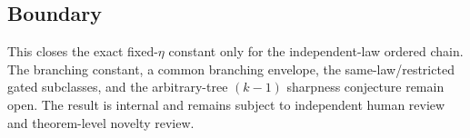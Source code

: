 \subsection*{Boundary}

This closes the exact fixed-$\eta$ constant only for the independent-law
ordered chain. The branching constant, a common branching envelope, the
same-law/restricted gated subclasses, and the arbitrary-tree $(k-1)$
sharpness conjecture remain open. The result is internal and remains subject
to independent human review and theorem-level novelty review.

